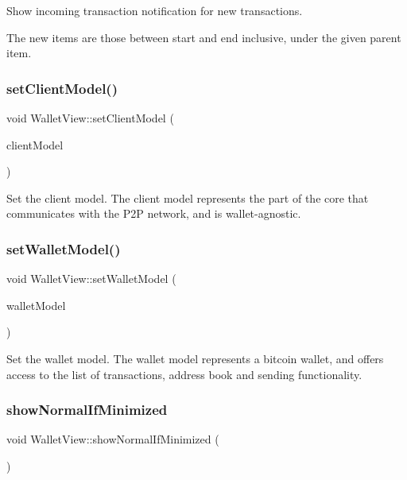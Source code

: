 Show incoming transaction notification for new transactions.

The new items are those between start and end inclusive, under the given parent item. \mbox{\label{class_wallet_view_a46d9a8d93adfdcc29cae9ff0d44c313e}} 
\subsubsection{\texorpdfstring{setClientModel()}{setClientModel()}}
{\footnotesize\ttfamily void Wallet\+View\+::set\+Client\+Model (\begin{DoxyParamCaption}\item[{\mbox{\hyperlink{class_client_model}{Client\+Model}} $\ast$}]{client\+Model }\end{DoxyParamCaption})}

Set the client model. The client model represents the part of the core that communicates with the P2P network, and is wallet-\/agnostic. \mbox{\label{class_wallet_view_a0a37ff693a4f9c1e5ddc23f9cd3913be}} 
\subsubsection{\texorpdfstring{setWalletModel()}{setWalletModel()}}
{\footnotesize\ttfamily void Wallet\+View\+::set\+Wallet\+Model (\begin{DoxyParamCaption}\item[{\mbox{\hyperlink{class_wallet_model}{Wallet\+Model}} $\ast$}]{wallet\+Model }\end{DoxyParamCaption})}

Set the wallet model. The wallet model represents a bitcoin wallet, and offers access to the list of transactions, address book and sending functionality. \mbox{\label{class_wallet_view_aac71ea140f87cd60081b56e579b6fa0c}} 
\subsubsection{\texorpdfstring{showNormalIfMinimized}{showNormalIfMinimized}}
{\footnotesize\ttfamily void Wallet\+View\+::show\+Normal\+If\+Minimized (\begin{DoxyParamCaption}{ }\end{DoxyParamCaption})\hspace{0.3cm}{\ttfamily [signal]}}

